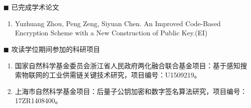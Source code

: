 \newpage
\section*{}
\vskip 5mm

\renewcommand{\labelenumi}{[\arabic{enumi}]}
{\heiti $\blacksquare$ 已完成学术论文}

\begin{enumerate}
	\item Yuzhuang Zhou, Peng Zeng, Siyuan Chen. An Improved Code-Based Encryption Scheme with a New Construction of Public Key.(EI)
\end{enumerate}

\renewcommand{\labelenumi}{[\arabic{enumi}]}
{\heiti $\blacksquare$ 攻读学位期间参加的科研项目}
\begin{enumerate}
	\item 国家自然科学基金委员会浙江省人民政府两化融合联合基金项目：基于感知搜索物联网的工业供需链关键技术研究，项目编号：U1509219。
	\item 上海市自然科学基金项目：后量子公钥加密和数字签名算法研究，项目编号：17ZR1408400。
\end{enumerate}